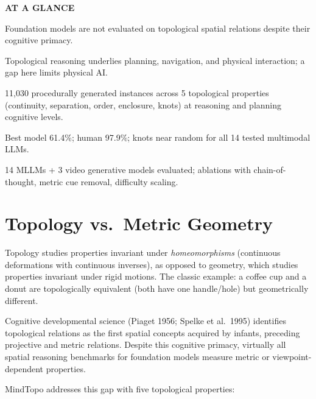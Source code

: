 \documentclass[10pt,twocolumn]{article}
\begin{document}
\begin{mdframed}[backgroundcolor=boxgray,linecolor=rulered,linewidth=1pt,
    innerleftmargin=6pt,innerrightmargin=6pt,
    innertopmargin=6pt,innerbottommargin=6pt]
\textbf{\small AT A GLANCE}\par\vspace{4pt}
\begin{description}[leftmargin=0pt,labelsep=4pt,itemsep=2pt,parsep=0pt,
    font=\small\bfseries]
  \item[Problem:] Foundation models are not evaluated on topological
    spatial relations despite their cognitive primacy.
  \item[Why it matters:] Topological reasoning underlies planning,
    navigation, and physical interaction; a gap here limits physical AI.
  \item[Method:] 11,030 procedurally generated instances across 5
    topological properties (continuity, separation, order, enclosure,
    knots) at reasoning and planning cognitive levels.
  \item[Result:] Best model 61.4\%; human 97.9\%; knots near random
    for all 14 tested multimodal LLMs.
  \item[Evidence:] 14 MLLMs + 3 video generative models evaluated;
    ablations with chain-of-thought, metric cue removal, difficulty scaling.
\end{description}
\end{mdframed}

\section{Topology vs.\ Metric Geometry}

Topology studies properties invariant under \emph{homeomorphisms}
(continuous deformations with continuous inverses), as opposed to
geometry, which studies properties invariant under rigid motions.
The classic example: a coffee cup and a donut are topologically
equivalent (both have one handle/hole) but geometrically different.

Cognitive developmental science (Piaget 1956; Spelke et al.\ 1995)
identifies topological relations as the first spatial concepts acquired
by infants, preceding projective and metric relations. Despite this
cognitive primacy, virtually all spatial reasoning benchmarks for
foundation models measure metric or viewpoint-dependent properties.

MindTopo addresses this gap with five topological properties:
\end{document}
